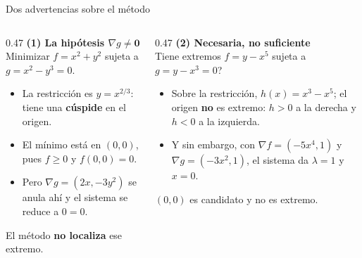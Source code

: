 \documentclass[11pt,aspectratio=169]{beamer}
\begin{document}
\begin{frame}{Dos advertencias sobre el método}
  \begin{columns}[t]
    \begin{column}{0.47\textwidth}
      \textbf{(1) La hipótesis $\nabla g\neq\mathbf 0$}\\[3pt]
      \small
      Minimizar $f=x^2+y^2$ sujeta a $g=x^2-y^3=0$.
      \pause
      \begin{itemize}
        \item La restricción es $y=x^{2/3}$: tiene una \textbf{cúspide} en el origen.
        \item El mínimo está en $(0,0)$, pues $f\ge0$ y $f(0,0)=0$.
        \item Pero $\nabla g=(2x,-3y^2)$ se anula ahí y el sistema se reduce a $0=0$.
      \end{itemize}
      \pause
      \begin{center}\color{brick} El método \textbf{no localiza} ese extremo.\end{center}
    \end{column}
    \begin{column}{0.47\textwidth}
      \pause
      \textbf{(2) Necesaria, no suficiente}\\[3pt]
      \small
      \textquestiondown{}Tiene extremos $f=y-x^5$ sujeta a $g=y-x^3=0$?
      \pause
      \begin{itemize}
        \item Sobre la restricción, $h(x)=x^3-x^5$; el origen \textbf{no} es extremo: $h>0$ a la derecha y $h<0$ a la izquierda.
        \item Y sin embargo, con $\nabla f=(-5x^4,1)$ y $\nabla g=(-3x^2,1)$, el sistema da $\lambda=1$ y $x=0$.
      \end{itemize}
      \pause
      \begin{center}\color{brick} $(0,0)$ es candidato y no es extremo.\end{center}
    \end{column}
  \end{columns}
  \vspace{2pt}
\end{frame}
\end{document}
